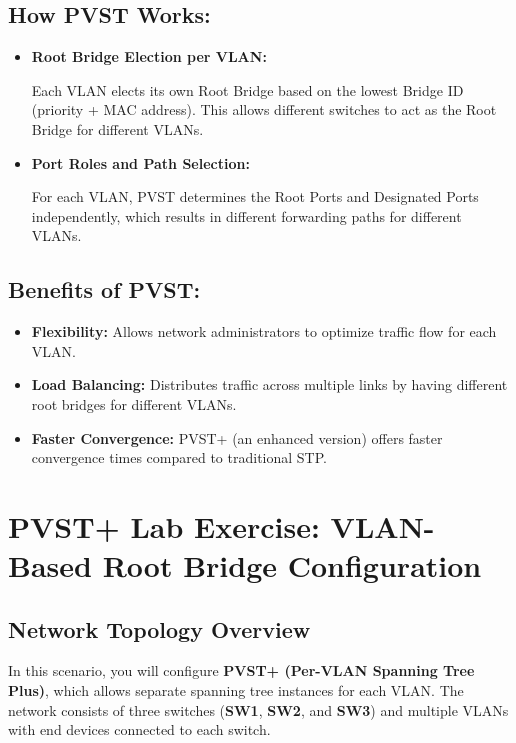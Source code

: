 \documentclass[a4paper]{book}
\begin{document}
\section*{How PVST Works:}
\begin{itemize}
    \item \textbf{Root Bridge Election per VLAN:}
    
    Each VLAN elects its own Root Bridge based on the lowest Bridge ID (priority + MAC address). This allows different switches to act as the Root Bridge for different VLANs.

    \item \textbf{Port Roles and Path Selection:}
    
    For each VLAN, PVST determines the Root Ports and Designated Ports independently, which results in different forwarding paths for different VLANs.
\end{itemize}


\section*{Benefits of PVST:}
\begin{itemize}
    \item \textbf{Flexibility:} Allows network administrators to optimize traffic flow for each VLAN.
    \item \textbf{Load Balancing:} Distributes traffic across multiple links by having different root bridges for different VLANs.
    \item \textbf{Faster Convergence:} PVST+ (an enhanced version) offers faster convergence times compared to traditional STP.

\end{itemize}

\newpage

\chapter{PVST+ Lab Exercise: VLAN-Based Root Bridge Configuration}

\section*{Network Topology Overview}
In this scenario, you will configure \textbf{PVST+ (Per-VLAN Spanning Tree Plus)}, which allows separate spanning tree instances for each VLAN. The network consists of three switches (\textbf{SW1}, \textbf{SW2}, and \textbf{SW3}) and multiple VLANs with end devices connected to each switch.
\end{document}
